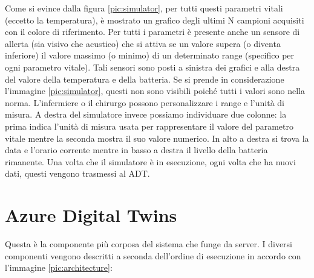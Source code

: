 Come si evince dalla figura \ref{pic:simulator}, per tutti questi parametri vitali (eccetto la temperatura), è mostrato un grafico degli ultimi N campioni acquisiti con il colore di riferimento. \newline \newline Per tutti i parametri è presente anche un sensore di allerta (sia visivo che acustico) che si attiva se un valore supera (o diventa inferiore) il valore massimo (o minimo) di un determinato range (specifico per ogni parametro vitale). Tali sensori sono posti a sinistra dei grafici e alla destra del valore della temperatura e della batteria. Se si prende in considerazione l'immagine \ref{pic:simulator}, questi non sono visibili poiché tutti i valori sono nella norma. L'infermiere o il chirurgo possono personalizzare i range e l'unità di misura. \newline \newline A destra del simulatore invece possiamo individuare due colonne: la prima indica l'unità di misura usata per rappresentare il valore del parametro vitale mentre la seconda mostra il suo valore numerico. In alto a destra si trova la data e l'orario corrente mentre in basso a destra il livello della batteria rimanente.
\newline \newline Una volta che il simulatore è in esecuzione, ogni volta che ha nuovi dati, questi vengono trasmessi al ADT.

\section{Azure Digital Twins}
Questa è la componente più corposa del sistema che funge da server. I diversi componenti vengono descritti a seconda dell'ordine di esecuzione in accordo con l'immagine \ref{pic:architecture}:

